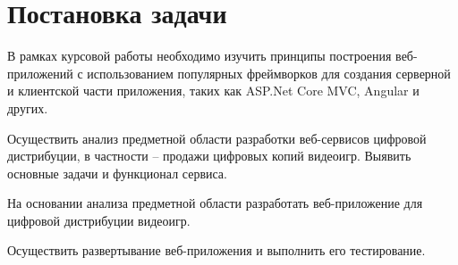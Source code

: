 \section{Постановка задачи}
\label{sec:practice:task_statement}

В рамках курсовой работы необходимо изучить принципы построения веб-приложений с использованием популярных фреймворков для создания
серверной и клиентской части приложения, таких как ASP.Net Core MVC, Angular и других. 

Осуществить анализ предметной области разработки веб-сервисов цифровой дистрибуции, в частности -- продажи цифровых копий видеоигр.
Выявить основные задачи и функционал сервиса.

На основании анализа предметной области разработать веб-приложение для цифровой дистрибуции видеоигр.

Осуществить развертывание веб-приложения и выполнить его тестирование.

